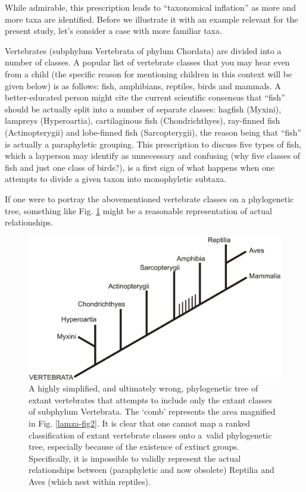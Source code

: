 \begin{artengenv}
While admirable, this prescription leads to ``taxonomical inflation'' as more and more taxa are identified. Before we
illustrate it with an example relevant for the present study, let’s consider a case with more familiar taxa.

Vertebrates (subphylum Vertebrata of phylum Chordata) are divided into a number of classes. A popular list of vertebrate
classes that you may hear even from a child (the specific reason for mentioning children in this context will be given
below) is as follows: fish, amphibians, reptiles, birds and mammals. A better-educated person might cite the current
scientific consensus that ``fish'' should be actually split into a number of separate classes: hagfish (Myxini), lampreys
(Hyperoartia), cartilaginous fish (Chondrichthyes), ray-finned fish (Actinopterygii) and lobe-finned fish
(Sarcopterygii), the reason being that ``fish'' is actually a paraphyletic grouping. This prescription to discuss five
types of fish, which a layperson may identify as unnecessary and confusing (why five classes of fish and just one class
of birds?), is a first sign of what happens when one attempts to divide a given taxon into monophyletic subtaxa.

If one were to portray the abovementioned vertebrate classes on a phylogenetic tree, something like Fig. \ref{lamza-fig1} might be a
reasonable representation of actual relationships.

\begin{figure}[h]
	\centering
	\includegraphics[width=1\textwidth]{PAU_Lamza/Lamzaorg-img001.pdf}
	\caption{A highly simplified, and ultimately wrong, phylogenetic tree of extant vertebrates that attempts to
		include only the extant classes of subphylum Vertebrata. The ‘comb’ represents the area magnified in Fig. \ref{lamza-fig2}. It is
		clear that one cannot map a ranked classification of extant vertebrate classes onto a~valid phylogenetic tree,
		especially because of the existence of extinct groups. Specifically, it is impossible to validly represent the actual
		relationships between (paraphyletic and now obsolete) Reptilia and Aves (which nest within reptiles).}
	\label{lamza-fig1}
\end{figure}


\end{artengenv}
